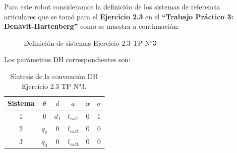 \documentclass[a4paper,12pt]{article}
\begin{document}
Para este robot consideramos la definición de los sistemas de referencia articulares que se tomó para el \textbf{Ejercicio 2.3} en el \textbf{``Trabajo Práctico 3: Denavit-Hartenberg''} como se muestra a continuación:
\begin{figure}[H]
    \centering
    \begin{adjustbox}{scale = 0.66, max width=\columnwidth}
    \end{adjustbox}
    \caption{Definición de sistemas Ejercicio 2.3 TP N°3}
\end{figure}

Los parámetros DH correspondientes son:
\begin{table}[H]
    \centering
    \begin{tabular}{|c|c|c|c|c|c|}
    \hline
    Sistema & $\theta$  & $d$ & $a$         & $\alpha$ & $\sigma$ \\ \hline
    1       & $0$       & $d_1$ & $l_{esl1}$  & 0      & 1        \\ \hline
    2       & $q_2$     & 0   & $l_{esl2}$  & 0        & 0        \\ \hline
    3       & $q_3$     & 0   & $l_{esl3}$  & 0        & 0        \\ \hline
    \end{tabular}
    \caption{Síntesis de la convención DH Ejercicio 2.3 TP N°3.}
\end{table}

\end{document}
